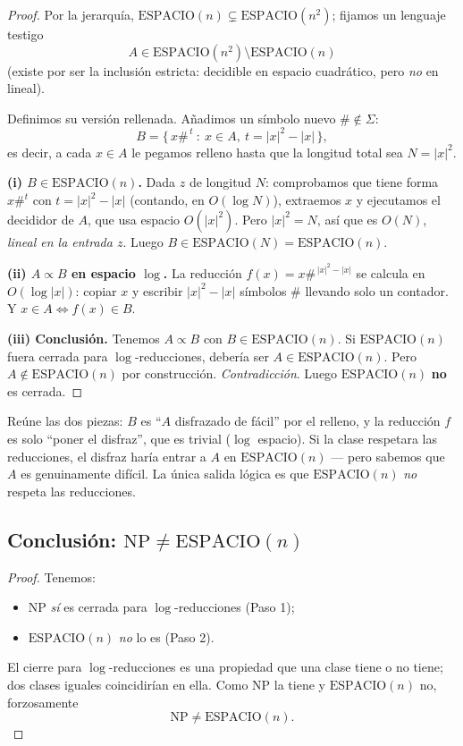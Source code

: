 \documentclass[11pt,a4paper]{article}
\theoremstyle{plain}
\theoremstyle{definition}
\newcommand{\NP}{\mathrm{NP}}
\newcommand{\SPACE}{\mathrm{ESPACIO}}
\newcommand{\reduce}{\propto}
\begin{document}
\begin{proof}
Por la jerarqu\'ia, $\SPACE(n)\subsetneq\SPACE(n^2)$; fijamos un lenguaje testigo
\[
A\in\SPACE(n^2)\setminus\SPACE(n)
\]
(existe por ser la inclusi\'on estricta: decidible en espacio cuadr\'atico, pero
\emph{no} en lineal).

Definimos su versi\'on rellenada. A\~nadimos un s\'imbolo nuevo $\#\notin\Sigma$:
\[
B=\{\,x\#^{\,t}\ :\ x\in A,\ t=|x|^2-|x|\,\},
\]
es decir, a cada $x\in A$ le pegamos relleno hasta que la longitud total sea
$N=|x|^2$.

\textbf{(i) $B\in\SPACE(n)$.} Dada $z$ de longitud $N$: comprobamos que tiene forma
$x\#^t$ con $t=|x|^2-|x|$ (contando, en $O(\log N)$), extraemos $x$ y ejecutamos el
decididor de $A$, que usa espacio $O(|x|^2)$. Pero $|x|^2=N$, as\'i que es $O(N)$,
\emph{lineal en la entrada $z$}. Luego $B\in\SPACE(N)=\SPACE(n)$.

\textbf{(ii) $A\reduce B$ en espacio $\log$.} La reducci\'on $f(x)=x\#^{\,|x|^2-|x|}$
se calcula en $O(\log|x|)$: copiar $x$ y escribir $|x|^2-|x|$ s\'imbolos $\#$ llevando
solo un contador. Y $x\in A\iff f(x)\in B$.

\textbf{(iii) Conclusi\'on.} Tenemos $A\reduce B$ con $B\in\SPACE(n)$. Si $\SPACE(n)$
fuera cerrada para $\log$-reducciones, deber\'ia ser $A\in\SPACE(n)$. Pero
$A\notin\SPACE(n)$ por construcci\'on. \emph{Contradicci\'on}. Luego $\SPACE(n)$
\textbf{no} es cerrada.
\end{proof}

\begin{porque}
Re\'une las dos piezas: $B$ es ``$A$ disfrazado de f\'acil'' por el relleno, y la
reducci\'on $f$ es solo ``poner el disfraz'', que es trivial ($\log$ espacio). Si la
clase respetara las reducciones, el disfraz har\'ia entrar a $A$ en $\SPACE(n)$ ---
pero sabemos que $A$ es genuinamente dif\'icil. La \'unica salida l\'ogica es que
$\SPACE(n)$ \emph{no} respeta las reducciones.
\end{porque}

\subsection*{Conclusi\'on: $\NP\neq\SPACE(n)$}

\begin{proof}
Tenemos:
\begin{itemize}[nosep]
  \item $\NP$ \emph{s\'i} es cerrada para $\log$-reducciones (Paso 1);
  \item $\SPACE(n)$ \emph{no} lo es (Paso 2).
\end{itemize}
El cierre para $\log$-reducciones es una propiedad que una clase tiene o no tiene; dos
clases iguales coincidir\'ian en ella. Como $\NP$ la tiene y $\SPACE(n)$ no,
forzosamente
\[
\boxed{\ \NP\neq\SPACE(n).\ }
\]
\end{proof}
\end{document}
